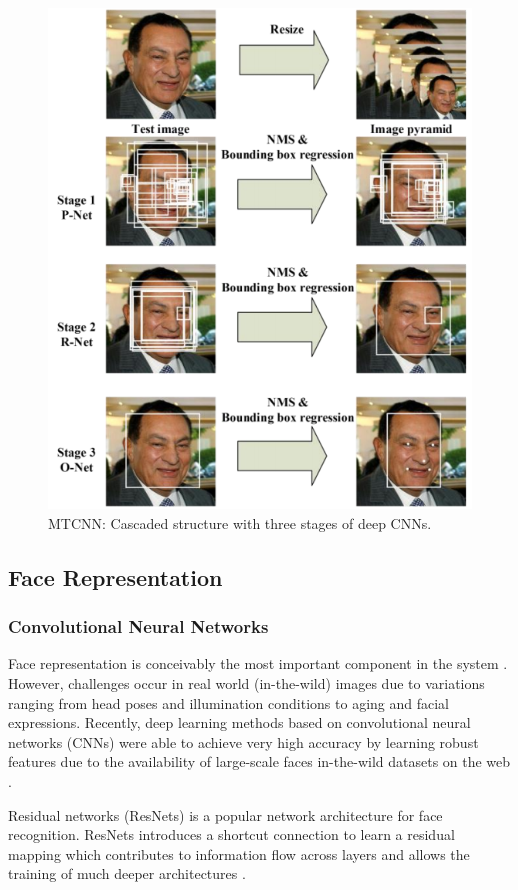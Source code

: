 \documentclass[12pt,english]{article}
\begin{document}
\begin{figure}[!tbp]
 \centering
    \includegraphics[width=0.7\columnwidth]{figures/mtcnn_pipeline.png}
    \caption{MTCNN: Cascaded structure with three stages of deep CNNs. \cite{zhang}}
	\label{fig:mtcnn}
\end{figure}


\subsection{Face Representation}

\subsubsection{Convolutional Neural Networks}

\quad
Face representation is conceivably the most important component in the system \cite{trigueros}. However, challenges occur in real world (in-the-wild) images due to variations ranging from head poses and illumination conditions to aging and facial expressions. Recently, deep learning methods based on convolutional neural networks (CNNs) were able to achieve very high accuracy by learning robust features due to the availability of large-scale faces in-the-wild datasets on the web \cite{trigueros}. 

Residual networks (ResNets) is a popular network architecture for face recognition. ResNets introduces a shortcut connection to learn a residual mapping which contributes to information flow across layers and allows the training of much deeper architectures \cite{trigueros}.
\end{document}
